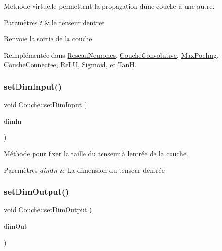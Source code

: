 Methode virtuelle permettant la propagation d\textquotesingle{}une couche à une autre. 


\begin{DoxyParams}{Paramètres}
{\em t} & le tenseur d\textquotesingle{}entree \\
\hline
\end{DoxyParams}
\begin{DoxyReturn}{Renvoie}
la sortie de la couche 
\end{DoxyReturn}


Réimplémentée dans \hyperlink{classReseauNeurones_a7079f7694f0369187b8ff28cefcbc5eb}{Reseau\+Neurones}, \hyperlink{classCoucheConvolutive_ad1a55b3dc9bf52e0725ae2a7b2e92aa1}{Couche\+Convolutive}, \hyperlink{classMaxPooling_a48e0258bf1f949853cfceb2726035fb8}{Max\+Pooling}, \hyperlink{classCoucheConnectee_acd60c499c6c74f914795f45f3f8084d0}{Couche\+Connectee}, \hyperlink{classReLU_a0d42917d6a9124571b0b467c81bce38a}{Re\+LU}, \hyperlink{classSigmoid_a6bd1f6bbc49bd7e634dc33701aee420c}{Sigmoid}, et \hyperlink{classTanH_a869967c9b278c6592e6fcc04b61a5f0c}{TanH}.

\mbox{\label{classCouche_ab24ce01bc6fb7b903013f7682ce60a7e}} 
\subsubsection{\texorpdfstring{set\+Dim\+Input()}{setDimInput()}}
{\footnotesize\ttfamily void Couche\+::set\+Dim\+Input (\begin{DoxyParamCaption}\item[{\hyperlink{classDimTenseur}{Dim\+Tenseur}}]{dim\+In }\end{DoxyParamCaption})}



Méthode pour fixer la taille du tenseur à l\textquotesingle{}entrée de la couche. 


\begin{DoxyParams}{Paramètres}
{\em dim\+In} & La dimension du tenseur d\textquotesingle{}entrée \\
\hline
\end{DoxyParams}
\mbox{\label{classCouche_a9af2f37eaf1063cb05abe980cfaa4cce}} 
\subsubsection{\texorpdfstring{set\+Dim\+Output()}{setDimOutput()}}
{\footnotesize\ttfamily void Couche\+::set\+Dim\+Output (\begin{DoxyParamCaption}\item[{\hyperlink{classDimTenseur}{Dim\+Tenseur}}]{dim\+Out }\end{DoxyParamCaption})}



